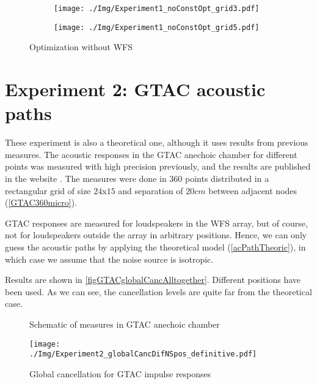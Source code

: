 \begin{figure}
	\centering
	\begin{subfigure}[b]{0.49\textwidth}
		\centering
		\texttt{[image: ./Img/Experiment1\_noConstOpt\_grid3.pdf]}
		\caption{}
	\end{subfigure}
	\begin{subfigure}[b]{0.49\textwidth}
		\centering
		\texttt{[image: ./Img/Experiment1\_noConstOpt\_grid5.pdf]}
		\caption{}
	\end{subfigure}
	\caption{Optimization without WFS}
	\label{figNoConst}
\end{figure}

\section{Experiment 2: GTAC acoustic paths}
These experiment is also a theoretical one, although it uses results from previous measures. The acoustic responses in the GTAC anechoic chamber for different points was measured with high precision previously, and the results are published in the website \cite{GTACroom}. The measures were done in 360 points distributed in a rectangular grid of size $24$x$15$ and separation of $20 \si{cm}$ between adjacent nodes (\autoref{GTAC360micro}).

GTAC responses are measured for loudspeakers in the WFS array, but of course, not for loudspeakers outside the array in arbitrary positions. Hence, we can only guess the acoustic paths by applying the theoretical model (\autoref{acPathTheoric}), in which case we assume that the noise source is isotropic.

Results are shown in \autoref{figGTACglobalCancAlltogether}. Different positions have been used. As we can see, the cancellation levels are quite far from the theoretical case.

\begin{figure}
	\begin{minipage}[b]{0.49\textwidth}
		\centering
		\caption[Schematic of measures in GTAC anechoic chamber]{Schematic of measures in GTAC anechoic chamber}
		\label{GTAC360micro}
	\end{minipage}
	\begin{minipage}[b]{0.49\textwidth}
	\centering
	\texttt{[image: ./Img/Experiment2\_globalCancDifNSpos\_definitive.pdf]}	
	\caption[Global cancellation for GTAC impulse responses]{Global cancellation for GTAC impulse responses}
	\label{figGTACglobalCancAlltogether}
\end{minipage}
\end{figure}

